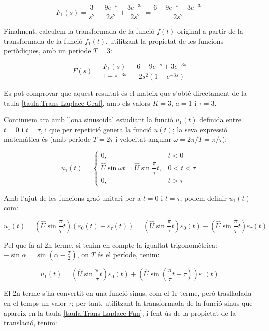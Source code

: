 \begin{exemple}[\CalcTransfLaplace{}]
    \[
        F_1(s) = \frac{3}{s^2} - \frac{9 e^{-s}}{2 s^2} + \frac{3 e^{-3s}}{2
        s^2} =\frac{6-9e^{-s}+3e^{-3s}}{2s^2}
    \]

    Finalment, calculem la transformada de la funció $f(t)$ original a
    partir de la transformada de la funció $f_1(t)$, utilitzant la
    propietat de les funcions periòdiques, amb un període $T=3$:

    \[
        F(s) = \frac{F_1(s)}{1-e^{-3s}} = \frac{6-9e^{-s}+3e^{-3s}}{2s^2(1-e^{-3s}) }
    \]

    Es pot comprovar que aquest resultat és el mateix que s'obté directament de la taula \vref{taula:Trans-Laplace-Graf}, amb els valors $K=3$, $a=1$ i $\tau=3$.

    Continuem ara  amb l'ona sinusoidal estudiant la funció $u_1(t)$
    definida entre $t=0$ i $t=\tau$, i que per repetició genera la
    funció $u(t)$; la seva expressió matemàtica és (amb període $T=
    2\tau$ i velocitat angular $\omega= 2\pi/T  = \pi/\tau$):

    \[
        u_1(t) = \begin{cases} 0, & t < 0\\ \hat{U}\sin\omega t =
        \hat{U}\sin\dfrac{\pi}{\tau}t,  & 0<t<\tau \\ 0, & t > \tau \end{cases}
    \]


    Amb l'ajut de les funcions graó unitari per a $t=0$ i $t=\tau$, podem
    definir $u_1(t)$ com:

    \[
        u_1(t)=\left(\hat{U}\sin\frac{\pi}{\tau}t\right)(\varepsilon_0(t)-\varepsilon_\tau(t))
        =\left(\hat{U}\sin\frac{\pi}{\tau}t\right)\varepsilon_0(t) - \left(\hat{U}\sin\frac{\pi}{\tau}t\right)\varepsilon_\tau(t)
    \]

    Pel que fa al 2n  terme, si tenim en compte la igualtat
    trigonomètrica: $-\sin \alpha = \sin(\alpha-\frac{T}{2})$, on $T$ és
    el període, tenim:

    \[
        u_1(t) = \left(\hat{U}\sin\frac{\pi}{\tau}t\right)\varepsilon_0(t) +
        \left(\hat{U}\sin\left(\frac{\pi}{\tau}t-\tau\right)\right)\varepsilon_\tau(t)
    \]

    El 2n terme s'ha convertit en una funció sinus, com el 1r terme,
    però traslladada en el temps un valor $\tau$; per tant, utilitzant la
    transformada de la funció sinus que apareix en la taula
    \vref{taula:Trans-Laplace-Fun}, i fent ús de la propietat de la
    translació, tenim:


\end{exemple}
